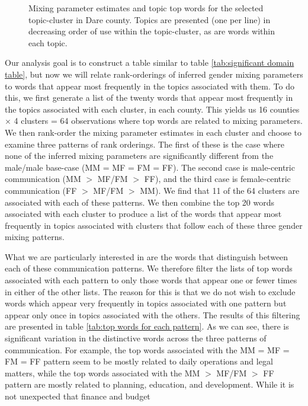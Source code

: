 \documentclass{pnastwo}
\begin{document}
\begin{article}
\begin{figure}
\begin{tabular}{m{}}
	\end{tabular}
	\caption{\label{tab: hoke 3 mp} Mixing parameter estimates and topic top words for the selected topic-cluster in Dare county. Topics are presented (one per line) in decreasing order of use within the topic-cluster, as are words within each topic.}
\end{figure}

Our analysis goal is to construct a table similar to table \ref{tab:significant domain table}, but now we will relate rank-orderings of inferred gender mixing parameters to words that appear most frequently in the topics associated with them. To do this, we first generate a list of the twenty words that appear most frequently in the topics associated with each cluster, in each county. This yields us 16 counties $\times$ 4 clusters = 64 observations where top words are related to mixing parameters. We then rank-order the mixing parameter estimates in each cluster and choose to examine three patterns of rank orderings. The first of these is the case where none of the inferred mixing parameters are significantly different from the male/male base-case (MM = MF = FM = FF). The second case is male-centric communication (MM $>$ MF/FM $>$ FF), and the third case is female-centric communication (FF $>$ MF/FM $>$ MM). We find that 11 of the 64 clusters are associated with each of these patterns. We then combine the top 20 words associated with each cluster to produce a list of the words that appear most frequently in topics associated with clusters that follow each of these three gender mixing patterns. 

What we are particularly interested in are the words that distinguish between each of these communication patterns. We therefore filter the lists of top words associated with each pattern to only those words that appear one or fewer times in either of the other lists. The reason for this is that we do not wish to exclude words which appear very frequently in topics associated with one pattern but appear only once in topics associated with the others. The results of this filtering are presented in table \ref{tab:top words for each pattern}. As we can see, there is significant variation in the distinctive words across the three patterns of communication. For example, the top words associated with the MM = MF = FM = FF pattern seem to be mostly related to daily operations and legal matters, while the top words associated with the MM $>$ MF/FM $>$ FF pattern are mostly related to planning, education, and development. While it is not unexpected that finance and budget




\end{article}
\end{document}
